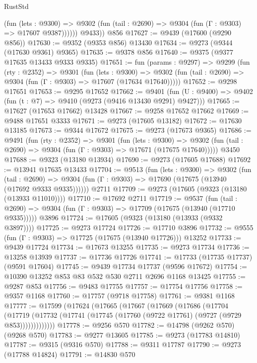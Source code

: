 \begin{lexlean}{RustStd}
\begin{coremodule}
              (fun (lets : @9300) =>
              @9302 (fun (tail : @2690) => @9304 (fun (Γ : @9303) => @17607 @9387))))))
        @9433))
    @856
@17627 := @9439 (@17600 (@9290 @856))
@17630 := @9352 (@9353 @856) @13430
@17634 := @9273 (@9344 (@17630 @9361) @9365)
@17635 := @9378 @856
@17640 := @9375 (@9377 @17635 @13433 @9333 @9335)
@17651 := fun (params : @9297) =>
  @9299
    (fun (rty : @2352) =>
    @9301
      (fun (lets : @9300) =>
      @9302 (fun (tail : @2690) => @9304 (fun (Γ : @9303) => @17607 (@17634 @17640)))))
@17652 := @9298 @17651
@17653 := @9295 @17652
@17662 := @9401
    (fun (U : @9400) => @9402 (fun (t : @7) => @9410 (@9273 (@9416 @13430 @9291) @9427)))
@17665 := @17627 (@17653 @17662) @13428
@17667 := @9258 @17652 @17662
@17669 := @9488 @17651 @3333
@17671 := @9273 (@17605 @13182)
@17672 := @17630 @13185
@17673 := @9344 @17672
@17675 := @9273 (@17673 @9365)
@17686 := @9491
    (fun (rty : @2352) =>
    @9301
      (fun (lets : @9300) =>
      @9302 (fun (tail : @2690) => @9304 (fun (Γ : @9303) => @17671 (@17675 @17640)))))
    @3450
@17688 := @9323 (@13180 @13934)
@17690 := @9273 (@17605 @17688)
@17692 := @13941 @17635 @13433
@17704 := @9513
    (fun (lets : @9300) =>
    @9302
      (fun (tail : @2690) =>
      @9304 (fun (Γ : @9303) => @17690 (@17675 (@13940 (@17692 @9333 @9335))))))
    @2711
@17709 := @9273 (@17605 (@9323 (@13180 (@13933 @11010))))
@17710 := @17692 @2711
@17719 := @9537
    (fun (tail : @2690) => @9304 (fun (Γ : @9303) => @17709 (@17675 (@13940 (@17710 @9335)))))
    @3896
@17724 := @17605 (@9323 (@13180 (@13933 (@9332 @3897))))
@17725 := @9273 @17724
@17726 := @17710 @3896
@17732 := @9555 (fun (Γ : @9303) => @17725 (@17675 (@13940 @17726))) @13252
@17733 := @9439 @17724
@17734 := @17673 @13255
@17735 := @9273 @17734
@17736 := @13258 @13939
@17737 := @17736 @17726
@17741 := @17733 (@17735 @17737) (@9591 @17604)
@17745 := @9439 @17734 @17737 (@9596 @17672)
@17754 := @10390 @13252 @853 @83 @532 @530 @2711 @2696 @1168 @13425
@17755 := @9287 @853
@17756 := @9483 @17755
@17757 := @17754 @17756
@17758 := @9357 @1168
@17760 := @17757 (@9718 @17758)
@17761 := @9381 @1168
@17777 := @17599
    (@17624
      (@17665
        (@17667
          (@17669
            (@17686
              (@17704
                (@17719
                  (@17732 (@17741 (@17745 (@17760 (@9722 @17761) (@9727 (@9729 @853)))))))))))))
@17778 := @9256 @570
@17782 := @14798 (@9262 @570) (@9268 @570)
@17783 := @9277 @13605
@17785 := @9273 (@17783 @14810)
@17787 := @9315 (@9316 @570)
@17788 := @9311 @17787
@17790 := @9273 (@17788 @14824)
@17791 := @14830 @570

\end{coremodule}
\end{lexlean}
